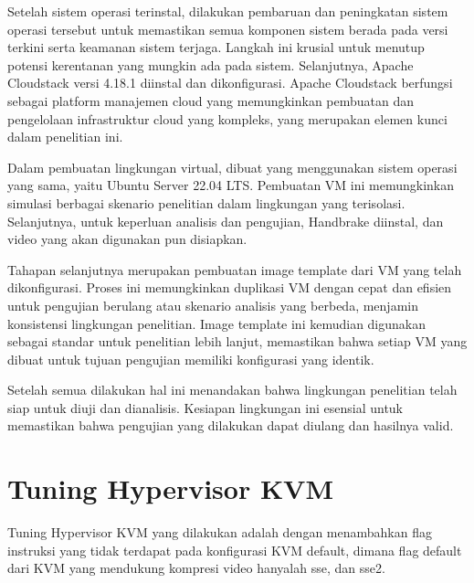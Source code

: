 Setelah sistem operasi terinstal, dilakukan pembaruan dan peningkatan sistem operasi tersebut untuk memastikan semua komponen sistem berada pada versi terkini serta keamanan sistem terjaga. Langkah ini krusial untuk menutup potensi kerentanan yang mungkin ada pada sistem. Selanjutnya, Apache Cloudstack versi 4.18.1 diinstal dan dikonfigurasi. Apache Cloudstack berfungsi sebagai platform manajemen cloud yang memungkinkan pembuatan dan pengelolaan infrastruktur cloud yang kompleks, yang merupakan elemen kunci dalam penelitian ini.

Dalam pembuatan lingkungan virtual, dibuat \vm yang menggunakan sistem operasi yang sama, yaitu Ubuntu Server 22.04 LTS. Pembuatan VM ini memungkinkan simulasi berbagai skenario penelitian dalam lingkungan yang terisolasi. Selanjutnya, untuk keperluan analisis dan pengujian, Handbrake diinstal, dan video yang akan digunakan pun disiapkan.

Tahapan selanjutnya merupakan pembuatan image template dari VM yang telah dikonfigurasi. Proses ini memungkinkan duplikasi VM dengan cepat dan efisien untuk pengujian berulang atau skenario analisis yang berbeda, menjamin konsistensi lingkungan penelitian. Image template ini kemudian digunakan sebagai standar untuk penelitian lebih lanjut, memastikan bahwa setiap VM yang dibuat untuk tujuan pengujian memiliki konfigurasi yang identik.

Setelah semua dilakukan hal ini menandakan bahwa lingkungan penelitian telah siap untuk diuji dan dianalisis. Kesiapan lingkungan ini esensial untuk memastikan bahwa pengujian yang dilakukan dapat diulang dan hasilnya valid.

\section{Tuning Hypervisor KVM}
Tuning Hypervisor KVM yang dilakukan adalah dengan menambahkan flag instruksi yang tidak terdapat pada konfigurasi KVM default, dimana flag default dari KVM yang mendukung kompresi video hanyalah sse, dan sse2.

